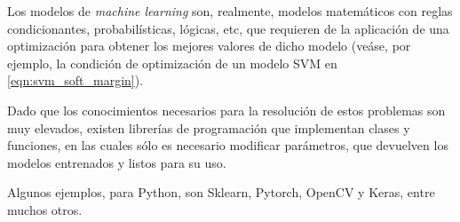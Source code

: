 Los modelos de \textit{machine learning} son, realmente, modelos matemáticos con reglas condicionantes, probabilísticas, lógicas, etc, que requieren de la aplicación de una optimización para obtener los mejores valores de dicho modelo (veáse, por ejemplo, la condición de optimización de un modelo SVM en \ref{eqn:svm_soft_margin}). 

Dado que los conocimientos necesarios para la resolución de estos problemas son muy elevados, existen librerías de programación que implementan clases y funciones, en las cuales sólo es necesario modificar parámetros, que devuelven los modelos entrenados y listos para su uso.

Algunos ejemplos, para Python, son Sklearn, Pytorch, OpenCV y Keras, entre muchos otros.


